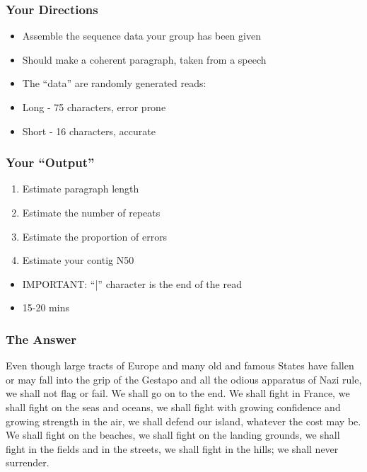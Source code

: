 \documentclass[14pt,handout]{beamer}
\begin{document}
\begin{frame}
\frametitle{Your Directions}
\begin{itemize}
	\item<+-> Assemble the sequence data your group has been given
	\item<+-> Should make a coherent paragraph, taken from a speech
	\item<+-> The ``data'' are randomly generated reads:
	\item<+-> Long - 75 characters, error prone
	\item<+-> Short - 16 characters, accurate 
\end{itemize}
\end{frame}

\begin{frame}
\frametitle{Your ``Output''}
\begin{enumerate}
	\item<+-> Estimate paragraph length
	\item<+-> Estimate the number of repeats
	\item<+-> Estimate the proportion of errors
	\item<+-> Estimate your contig N50
\end{enumerate}
\begin{itemize}
	\item<+-> IMPORTANT: ``|'' character is the end of the read
	\item<+-> 15-20 mins
\end{itemize}
\end{frame}

\begin{frame}
\frametitle{The Answer}
\ttfamily
\small
Even though large tracts of Europe and many old and famous States have fallen or may fall into the grip of the Gestapo and all the odious apparatus of Nazi rule, we shall not flag or fail. We shall go on to the end. We shall fight in France, we shall fight on the seas and oceans, we shall fight with growing confidence and growing strength in the air, we shall defend our island, whatever the cost may be. We shall fight on the beaches, we shall fight on the landing grounds, we shall fight in the fields and in the streets, we shall fight in the hills; we shall never surrender.
\end{frame}
\end{document}
